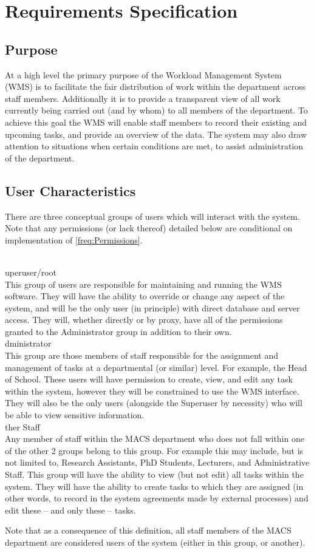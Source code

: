 \documentclass[11pt, a4paper]{article}
\def\itempar#1\\{\item \textbf{#1}\\} %
\begin{document}
\section{Requirements Specification}

\subsection{Purpose}
At a high level the primary purpose of the Workload Management System (WMS) is to facilitate the fair distribution of work within the department across staff members. Additionally it is to provide a transparent view of all work currently being carried out (and by whom) to all members of the department. To achieve this goal the WMS will enable staff members to record their existing and upcoming tasks, and provide an overview of the data. The system may also draw attention to situations when certain conditions are met, to assist administration of the department.

\subsection{User Characteristics} \label{subsec:Users}

There are three conceptual groups of users which will interact with the system. Note that any permissions (or lack thereof) detailed below are conditional on implementation of \autoref{freq:Permissions}.

\begin{enumerate}
\itempar Superuser/root\\
This group of users are responsible for maintaining and running the WMS software. They will have the ability to override or change any aspect of the system, and will be the only user (in principle) with direct database and server access. They will, whether directly or by proxy, have all of the permissions granted to the Administrator group in addition to their own.
\itempar Administrator\\
This group are those members of staff responsible for the assignment and management of tasks at a departmental (or similar) level. For example, the Head of School. These users will have permission to create, view, and edit any task within the system, however they will be constrained to use the WMS interface. They will also be the only users (alongside the Superuser by necessity) who will be able to view sensitive information.
\itempar Other Staff\\
Any member of staff within the MACS department who does not fall within one of the other 2 groups belong to this group. For example this may include, but is not limited to, Research Assistants, PhD Students, Lecturers, and Administrative Staff. This group will have the ability to view (but not edit) all tasks within the system. They will have the ability to create tasks to which they are assigned (in other words, to record in the system agreements made by external processes) and edit these -- and only these -- tasks.

Note that as a consequence of this definition, all staff members of the MACS department are considered users of the system (either in this group, or another).
\end{enumerate}
\end{document}
